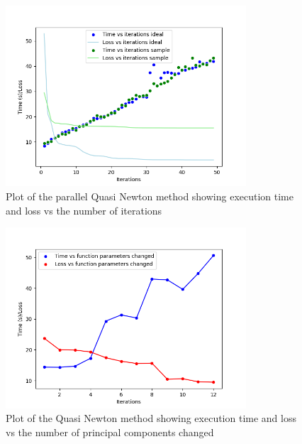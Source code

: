 \begin{figure}[H]
    \centering
    \includegraphics[width = 0.8\textwidth]{figures/plot_quasiNewton_time.png}
    \caption[Parallel quasi Newton: time and loss vs iterations]{Plot of the parallel Quasi Newton method showing execution time and loss vs the number of iterations}
    \label{fig:plot_quasiNewton_time}
\end{figure}

\begin{figure}[H]
    \centering
    \includegraphics[width = 0.8\textwidth]{figures/plot_quasiNewton_fun_params.png}
    \caption[Parallel quasi Newton: time and loss vs principal components]{Plot of the Quasi Newton method showing execution time and loss vs the number of principal components changed}
    \label{fig:plot_quasiNewton_fun_params}
\end{figure}

